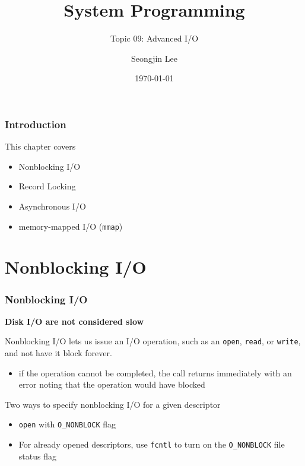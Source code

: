 \documentclass[newPxFont,sthlmFooter,nooffset]{beamer}
\title{System Programming}
\subtitle{Topic 09: Advanced I/O}
\author[SJL]{Seongjin Lee}
\institute{\href{mailto:insight@gnu.ac.kr}{insight@gnu.ac.kr}\\\url{http://open.gnu.ac.kr}\\Systems Research Lab.\\Gyeongsang National University}
\date{\today}
\begin{document}
\frame[plain]{\titlepage}






\begin{frame}[t]
  \frametitle{Introduction}
This chapter covers
\begin{itemize}
\item Nonblocking I/O
\item Record Locking
\item Asynchronous I/O
\item memory-mapped I/O (\texttt{mmap})
\end{itemize}
\end{frame}

\section{Nonblocking I/O}

\begin{frame}[t]
  \frametitle{Nonblocking I/O}

\textbf{Disk I/O are not considered slow}
\bigskip

Nonblocking I/O lets us issue an I/O operation, such as an \texttt{open}, \texttt{read}, or \texttt{write}, and not have it block forever.
\begin{itemize}
\item if the operation cannot be completed, the call returns immediately with an error noting that the operation would have blocked
\end{itemize}

\bigskip
Two ways to specify nonblocking I/O for a given descriptor
\begin{itemize}
\item \texttt{open} with \texttt{O\_NONBLOCK} flag
\item For already opened descriptors, use \texttt{fcntl} to turn on the \texttt{O\_NONBLOCK} file status flag
\end{itemize}
\end{frame}
\end{document}
